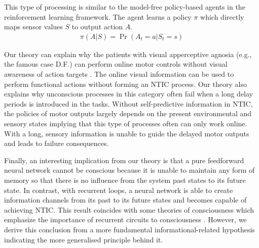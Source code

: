 \documentclass[utf8]{article}
\begin{document}
             This type of processing is similar to the model-free policy-based agents in the reinforcement learning framework. The agent learns a policy $\pi$ which directly maps sensor values $S$ to output action $A$.
    		\begin{equation}
    			\label{eq:PolicyBasedAgent}
    			\begin{aligned}
    			    \pi(A | S)=\operatorname{Pr}\left(A_{t}=a | S_{t}=s\right)
    			\end{aligned}
    		\end{equation}
    		
    		Our theory can explain why the patients with visual apperceptive agnosia (e.g., the famous case D.F.\cite{james2003ventral}) can perform online motor controls without visual awareness of action targets \citep{10.3389/fneur.2014.00255}. The online visual information can be used to perform functional actions without forming an NTIC process. Our theory also explains why unconscious processes in this category often fail when a long delay periods is introduced in the tasks. Without self-predictive information in NTIC, the policies of motor outputs largely depends on the present environmental and sensory states implying that this type of processes often can only work online. With a long, sensory information is unable to guide the delayed motor outputs and leads to failure consequences. 
    		
    		Finally, an interesting implication from our theory is that a pure feedforward neural network cannot be conscious because it is unable to maintain any form of memory so that there is no influence from the system past states to its future state. In contrast, with recurrent loops, a neural network is able to create information channels from its past to its future states and becomes capable of achieving NTIC. This result coincides with some theories of consciousness which emphasize the importance of recurrent circuits to consciousness \citep{lamme2006towards, edelman1992bright, tononi2008neural}.
    		However, we derive this conclusion from a more fundamental informational-related hypothesis indicating the more generalised principle behind it. 


\end{document}
